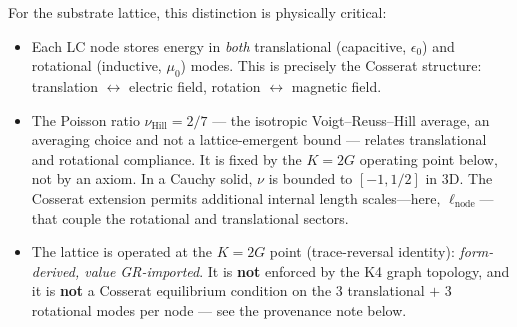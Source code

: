 For the substrate lattice, this distinction is physically critical:
\begin{itemize}
    \item Each LC node stores energy in \emph{both} translational (capacitive, $\epsilon_0$) and rotational (inductive, $\mu_0$) modes. This is precisely the Cosserat structure: translation $\leftrightarrow$ electric field, rotation $\leftrightarrow$ magnetic field.
    \item The Poisson ratio $\nu_\text{Hill} = 2/7$ ---  the isotropic Voigt--Reuss--Hill average, an averaging choice and not a lattice-emergent bound --- relates translational and rotational compliance. It is fixed by the $K = 2G$ operating point below, not by an axiom. In a Cauchy solid, $\nu$ is bounded to $[-1, 1/2]$ in 3D. The Cosserat extension permits additional internal length scales---here, $\ell_\text{node}$---that couple the rotational and translational sectors.
    \item The lattice is operated at the $K = 2G$ point (trace-reversal identity): \emph{form-derived, value GR-imported}. It is \textbf{not} enforced by the K4 graph topology, and it is \textbf{not} a Cosserat equilibrium condition on the 3 translational $+$ 3 rotational modes per node --- see the provenance note below.
\end{itemize}

